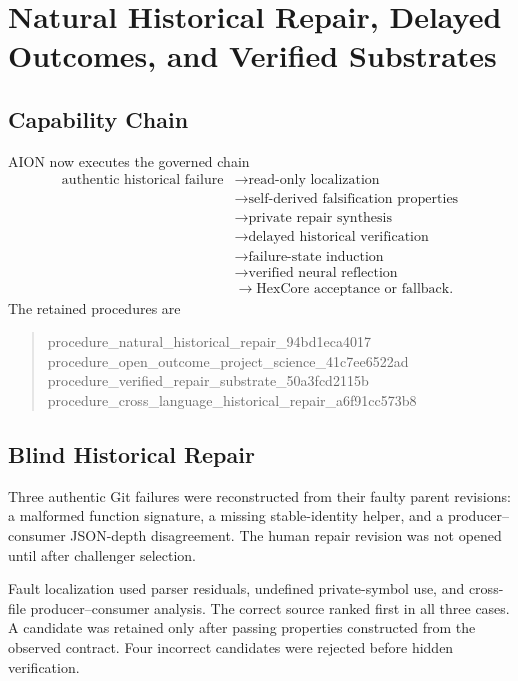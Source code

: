 \section{Natural Historical Repair, Delayed Outcomes, and Verified Substrates}
\label{sec:natural-repair-outcome-substrate}

\subsection{Capability Chain}

AION now executes the governed chain
\[
\begin{aligned}
\text{authentic historical failure}
&\rightarrow \text{read-only localization}\\
&\rightarrow \text{self-derived falsification properties}\\
&\rightarrow \text{private repair synthesis}\\
&\rightarrow \text{delayed historical verification}\\
&\rightarrow \text{failure-state induction}\\
&\rightarrow \text{verified neural reflection}\\
&\rightarrow \text{HexCore acceptance or fallback}.
\end{aligned}
\]
The retained procedures are
\begin{quote}
\small\ttfamily
procedure\_natural\_historical\_repair\_94bd1eca4017\\
procedure\_open\_outcome\_project\_science\_41c7ee6522ad\\
procedure\_verified\_repair\_substrate\_50a3fcd2115b
\\
procedure\_cross\_language\_historical\_repair\_a6f91cc573b8
\end{quote}

\subsection{Blind Historical Repair}

Three authentic Git failures were reconstructed from their faulty parent
revisions: a malformed function signature, a missing stable-identity helper,
and a producer--consumer JSON-depth disagreement. The human repair revision was
not opened until after challenger selection.

Fault localization used parser residuals, undefined private-symbol use, and
cross-file producer--consumer analysis. The correct source ranked first in all
three cases. A candidate was retained only after passing properties constructed
from the observed contract. Four incorrect candidates were rejected before
hidden verification.

